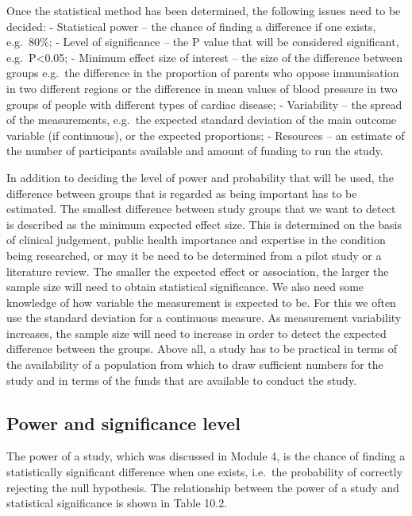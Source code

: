 \documentclass[
]{memoir}
\begin{document}
Once the statistical method has been determined, the following issues need to be decided:
- Statistical power -- the chance of finding a difference if one exists, e.g.~80\%;
- Level of significance -- the P value that will be considered significant, e.g.~P\textless0.05;
- Minimum effect size of interest -- the size of the difference between groups e.g.~the difference in the proportion of parents who oppose immunisation in two different regions or the difference in mean values of blood pressure in two groups of people with different types of cardiac disease;
- Variability -- the spread of the measurements, e.g.~the expected standard deviation of the main outcome variable (if continuous), or the expected proportions;
- Resources -- an estimate of the number of participants available and amount of funding to run the study.

In addition to deciding the level of power and probability that will be used, the difference between groups that is regarded as being important has to be estimated. The smallest difference between study groups that we want to detect is described as the minimum expected effect size. This is determined on the basis of clinical judgement, public health importance and expertise in the condition being researched, or may it be need to be determined from a pilot study or a literature review. The smaller the expected effect or association, the larger the sample size will need to obtain statistical significance.
We also need some knowledge of how variable the measurement is expected to be. For this we often use the standard deviation for a continuous measure. As measurement variability increases, the sample size will need to increase in order to detect the expected difference between the groups.
Above all, a study has to be practical in terms of the availability of a population from which to draw sufficient numbers for the study and in terms of the funds that are available to conduct the study.

\hypertarget{power-and-significance-level}{%
\subsection{Power and significance level}\label{power-and-significance-level}}

The power of a study, which was discussed in Module 4, is the chance of finding a statistically significant difference when one exists, i.e.~the probability of correctly rejecting the null hypothesis. The relationship between the power of a study and statistical significance is shown in Table 10.2.
\end{document}
